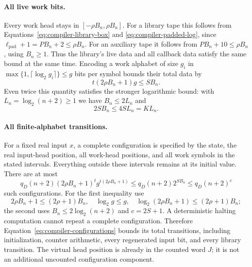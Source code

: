 \paragraph{All live work bits.}
Every work head stays in
$[-\rho B_n,\rho B_n]$.  For a library tape this follows from
Equations~\eqref{eq:compiler-library-box} and
\eqref{eq:compiler-padded-log}, since
$\ell_{\mathrm{pad}}+1=PB_n+2\le\rho B_n$.
For an auxiliary tape it follows from
$PB_n+10\le\rho B_n$, using $B_n\ge1$.
Thus the library's live data and all callback data satisfy the same
bound at the same time.  Encoding a work alphabet of size $g_i$ in
$\max\{1,\lceil\log_2 g_i\rceil\}\le g$ bits per symbol bounds
their total data by
\begin{equation}\label{eq:compiler-space-bound}
 t(2\rho B_n+1)g\le SB_n.
\end{equation}
Even twice this quantity satisfies the stronger logarithmic bound: with
$L_n=\log_2(n+2)\ge1$ we have $B_n\le2L_n$ and
\[
 2SB_n\le4SL_n=K L_n.
\]

\paragraph{All finite-alphabet transitions.}
For a fixed real input $x$, a complete configuration is specified by
the state, the real input-head position, all work-head positions, and
all work symbols in the stated intervals.  Everything outside these
intervals remains at its initial value.  There are at most
\begin{equation}\label{eq:compiler-configurations}
 q_D(n+2)(2\rho B_n+1)^t
       g^{t(2\rho B_n+1)}
 \le q_D(n+2)2^{SB_n}
 \le q_D(n+2)^c
\end{equation}
such configurations.  For the first inequality use
\[
 2\rho B_n+1\le(2\rho+1)B_n,
 \quad \log_2g\le g,
 \quad \log_2(2\rho B_n+1)\le(2\rho+1)B_n;
\]
the second uses $B_n\le2\log_2(n+2)$ and $c=2S+1$.
A deterministic halting computation cannot repeat a complete
configuration.  Therefore Equation~\eqref{eq:compiler-configurations}
bounds its total transitions, including initialization, counter
arithmetic, every regenerated input bit, and every library transition.
The virtual head position is already in the counted word $J$; it is
not an additional uncounted configuration component.

